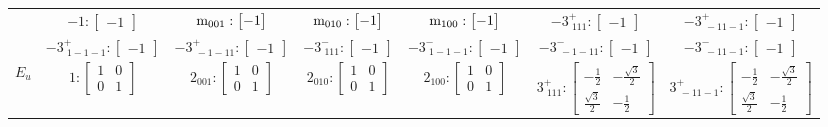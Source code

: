 \documentclass[fleqn,8pt,landscape]{jsarticle}
\begin{document}
\begin{longtable}{ccccccc}
& $ -1:\begin{bmatrix} -1 \end{bmatrix} $ & $ {\rm m}_{001}:\begin{bmatrix} -1 \end{bmatrix} $ & $ {\rm m}_{010}:\begin{bmatrix} -1 \end{bmatrix} $ & $ {\rm m}_{100}:\begin{bmatrix} -1 \end{bmatrix} $ & $ -3^{+}_{\,\,111}:\begin{bmatrix} -1 \end{bmatrix} $ & $ -3^{+}_{\,\,-11-1}:\begin{bmatrix} -1 \end{bmatrix} $ \\
& $ -3^{+}_{\,\,1-1-1}:\begin{bmatrix} -1 \end{bmatrix} $ & $ -3^{+}_{\,\,-1-11}:\begin{bmatrix} -1 \end{bmatrix} $ & $ -3^{-}_{\,\,111}:\begin{bmatrix} -1 \end{bmatrix} $ & $ -3^{-}_{\,\,1-1-1}:\begin{bmatrix} -1 \end{bmatrix} $ & $ -3^{-}_{\,\,-1-11}:\begin{bmatrix} -1 \end{bmatrix} $ & $ -3^{-}_{\,\,-11-1}:\begin{bmatrix} -1 \end{bmatrix} $ \\ \hline
$ E_{u} $ & $ 1:\begin{bmatrix} 1 & 0 \\ 0 & 1 \end{bmatrix} $ & $ 2{}_{001}:\begin{bmatrix} 1 & 0 \\ 0 & 1 \end{bmatrix} $ & $ 2{}_{010}:\begin{bmatrix} 1 & 0 \\ 0 & 1 \end{bmatrix} $ & $ 2{}_{100}:\begin{bmatrix} 1 & 0 \\ 0 & 1 \end{bmatrix} $ & $ 3^{+}_{\,\,111}:\begin{bmatrix} - \frac{1}{2} & - \frac{\sqrt{3}}{2} \\ \frac{\sqrt{3}}{2} & - \frac{1}{2} \end{bmatrix} $ & $ 3^{+}_{\,\,-11-1}:\begin{bmatrix} - \frac{1}{2} & - \frac{\sqrt{3}}{2} \\ \frac{\sqrt{3}}{2} & - \frac{1}{2} \end{bmatrix} $ \\

\end{longtable}
\end{document}
